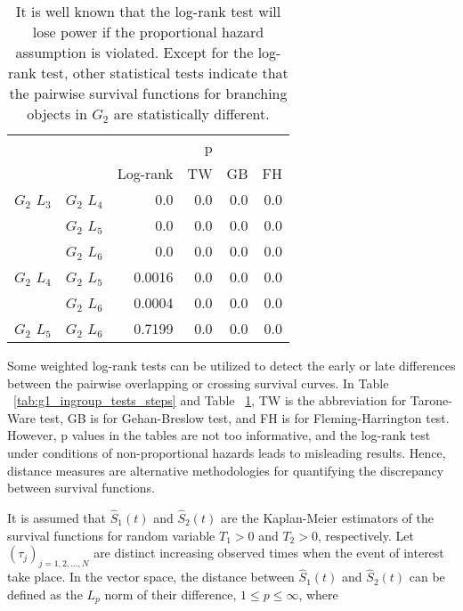       \begin{table}
        \centering
        \begin{tabular}{llrrrr}
          \toprule
                       &             &         &  p &    &     \\
          \cmidrule{3-6}
                       &             & Log-rank & TW & GB & FH  \\
          \midrule
          $G_2$ $L_3$  & $G_2$ $L_4$  &  0.0 &  0.0 &  0.0 &  0.0     \\
                       & $G_2$ $L_5$  & 0.0 & 0.0 & 0.0 & 0.0    \\
                       & $G_2$ $L_6$  & 0.0 & 0.0 & 0.0 & 0.0      \\
          $G_2$ $L_4$  & $G_2$ $L_5$  & 0.0016 & 0.0 & 0.0 & 0.0      \\
                       & $G_2$ $L_6$  & 0.0004 & 0.0 & 0.0 & 0.0       \\
          $G_2$ $L_5$   & $G_2$ $L_6$ & 0.7199 &  0.0 & 0.0 & 0.0      \\
          \bottomrule
        \end{tabular}
        \caption{It is well known that the log-rank test will lose
          power if the proportional hazard assumption is
          violated. Except for the log-rank test, other statistical
          tests indicate that the pairwise survival functions for
          branching objects in $G_2$ are statistically different.}
        \label{tab:g2_ingroup_tests_steps}
      \end{table}
      

      Some weighted log-rank tests can be utilized to detect the early
      or late differences between the pairwise overlapping or crossing
      survival curves. In Table ~\ref{tab:g1_ingroup_tests_steps} and
      Table ~\ref{tab:g2_ingroup_tests_steps}, TW is the abbreviation
      for Tarone-Ware test, GB is for Gehan-Breslow test, and FH is
      for Fleming-Harrington test. However, p values in the tables are
      not too informative, and the log-rank test under conditions of
      non-proportional hazards leads to misleading results. Hence,
      distance measures are alternative methodologies for quantifying
      the discrepancy between survival functions.
      

      It is assumed that $\widehat S_1(t)$ and $\widehat S_2(t)$ are
      the Kaplan-Meier estimators of the survival functions for random
      variable $T_1 > 0$ and $T_2 > 0$, respectively. Let
      $(\tau_j)_{j=1, 2, ..., N}$ are distinct increasing observed
      times when the event of interest take place. In the vector
      space, the distance between $\widehat S_1(t)$ and $\widehat
      S_2(t)$ can be defined as the $L_p$ norm of their difference, $
      1 \leq p \leq \infty$, where

